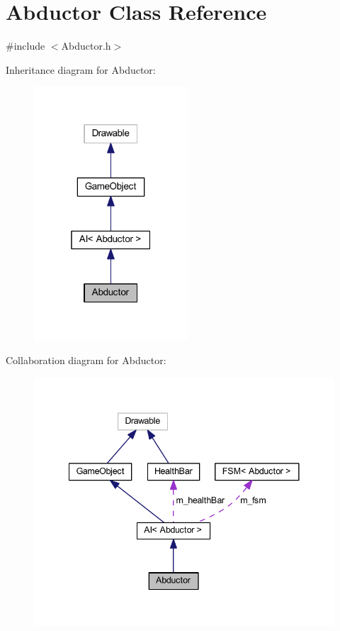 \hypertarget{class_abductor}{}\section{Abductor Class Reference}
\label{class_abductor}


{\ttfamily \#include $<$Abductor.\+h$>$}



Inheritance diagram for Abductor\+:\nopagebreak
\begin{figure}[H]
\begin{center}
\leavevmode
\includegraphics[width=163pt]{class_abductor__inherit__graph}
\end{center}
\end{figure}


Collaboration diagram for Abductor\+:\nopagebreak
\begin{figure}[H]
\begin{center}
\leavevmode
\includegraphics[width=341pt]{class_abductor__coll__graph}
\end{center}
\end{figure}
